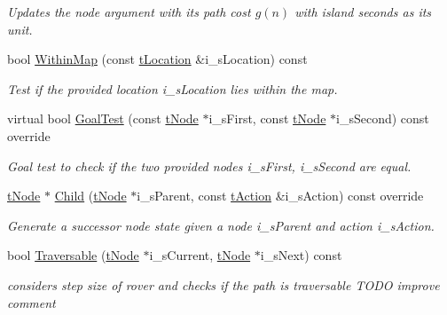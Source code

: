 \begin{DoxyCompactItemize}
\begin{DoxyCompactList}\small\item\em Updates the node argument with its path cost $g(n)$ with island seconds as its unit. \end{DoxyCompactList}\item 
bool \mbox{\hyperlink{classplanner_1_1c_planner_ac5119e3243d9f6747f1da0ed6d356642}{Within\+Map}} (const \mbox{\hyperlink{structplanner_1_1t_location}{t\+Location}} \&i\+\_\+s\+Location) const
\begin{DoxyCompactList}\small\item\em Test if the provided location i\+\_\+s\+Location lies within the map. \end{DoxyCompactList}\item 
virtual bool \mbox{\hyperlink{classplanner_1_1c_planner_a8b241ebd7bb3bde3dd062c50a2a42339}{Goal\+Test}} (const \mbox{\hyperlink{structplanner_1_1t_node}{t\+Node}} $\ast$i\+\_\+s\+First, const \mbox{\hyperlink{structplanner_1_1t_node}{t\+Node}} $\ast$i\+\_\+s\+Second) const override
\begin{DoxyCompactList}\small\item\em Goal test to check if the two provided nodes i\+\_\+s\+First, i\+\_\+s\+Second are equal. \end{DoxyCompactList}\item 
\mbox{\hyperlink{structplanner_1_1t_node}{t\+Node}} $\ast$ \mbox{\hyperlink{classplanner_1_1c_planner_a7ddb18b161e5d59cfe733bce32c31896}{Child}} (\mbox{\hyperlink{structplanner_1_1t_node}{t\+Node}} $\ast$i\+\_\+s\+Parent, const \mbox{\hyperlink{structplanner_1_1t_action}{t\+Action}} \&i\+\_\+s\+Action) const override
\begin{DoxyCompactList}\small\item\em Generate a successor node state given a node i\+\_\+s\+Parent and action i\+\_\+s\+Action. \end{DoxyCompactList}\item 
bool \mbox{\hyperlink{classplanner_1_1c_planner_a34b0582ca32cc235837c0b638b39e3af}{Traversable}} (\mbox{\hyperlink{structplanner_1_1t_node}{t\+Node}} $\ast$i\+\_\+s\+Current, \mbox{\hyperlink{structplanner_1_1t_node}{t\+Node}} $\ast$i\+\_\+s\+Next) const
\begin{DoxyCompactList}\small\item\em considers step size of rover and checks if the path is traversable T\+O\+DO improve comment \end{DoxyCompactList}\item 

\end{DoxyCompactItemize}

